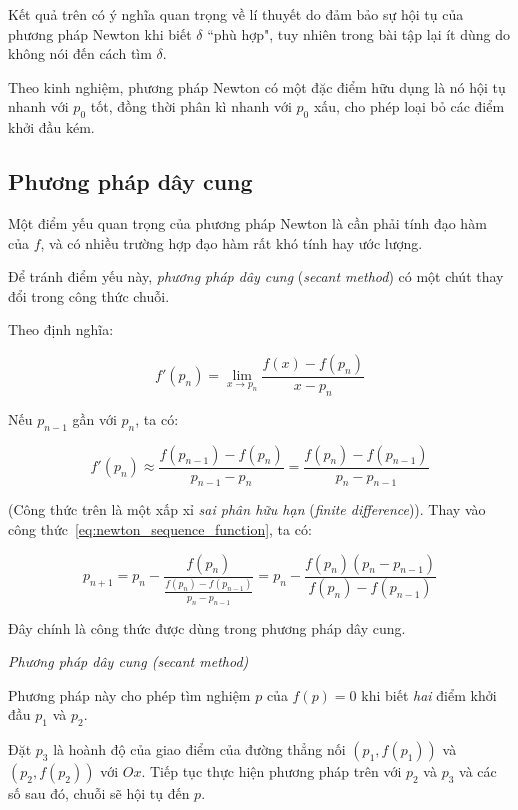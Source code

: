 \documentclass[../../Lectures]{subfiles}
\begin{document}
Kết quả trên có ý nghĩa quan trọng về lí thuyết do đảm bảo sự hội tụ của phương
pháp Newton khi biết \(\delta\) ``phù hợp", tuy nhiên trong bài tập lại ít dùng
do không nói đến cách tìm \(\delta\).

Theo kinh nghiệm, phương pháp Newton có một đặc điểm hữu dụng là nó hội tụ nhanh
với \(p_0\) tốt, đồng thời phân kì nhanh với \(p_0\) xấu, cho phép loại bỏ các
điểm khởi đầu kém.

\subsection{Phương pháp dây cung}

Một điểm yếu quan trọng của phương pháp Newton là cần phải tính đạo hàm của
\(f\), và có nhiều trường hợp đạo hàm rất khó tính hay ước lượng.

Để tránh điểm yếu này, \emph{phương pháp dây cung} (\emph{secant method}) có một
chút thay đổi trong công thức chuỗi.

Theo định nghĩa:

\[f'(p_n) = \lim_{x \to p_n} \frac{f(x) - f(p_n)}{x - p_n}\]

Nếu \(p_{n - 1}\) gần với \(p_n\), ta có:

\[f'(p_n) \approx \frac{f(p_{n - 1}) - f(p_n)}{p_{n - 1} - p_n} = \frac{f(p_n) - f(p_{n - 1})}{p_n - p_{n - 1}}\]

(Công thức trên là một xấp xỉ \emph{sai phân hữu hạn} (\emph{finite
difference})). Thay vào công thức~\ref{eq:newton_sequence_function}, ta có:

\begin{equation}\label{eq:secant_method}
    p_{n + 1} = p_n - \frac{f(p_n)}{\frac{f(p_n) - f(p_{n - 1})}{p_n - p_{n - 1}}} = p_n - \frac{f(p_n) (p_n - p_{n - 1})}{f(p_n) - f(p_{n - 1})}
\end{equation}

Đây chính là công thức được dùng trong phương pháp dây cung.

\begin{method}\label{method:secant}
    \emph{Phương pháp dây cung (secant method)}

    Phương pháp này cho phép tìm nghiệm \(p\) của \(f(p) = 0\) khi biết
    \emph{hai} điểm khởi đầu \(p_1\) và \(p_2\).

    Đặt \(p_3\) là hoành độ của giao điểm của đường thẳng nối \((p_1, f(p_1))\)
    và \((p_2, f(p_2))\) với \(Ox\). Tiếp tục thực hiện phương pháp trên với
    \(p_2\) và \(p_3\) và các số sau đó, chuỗi sẽ hội tụ đến \(p\).
\end{method}
\end{document}
